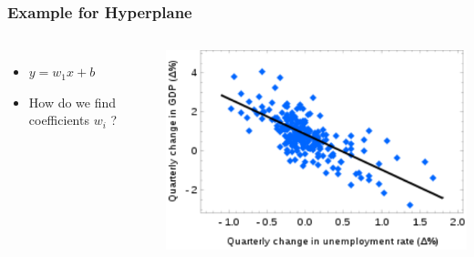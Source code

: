 \begin{frame}
    \frametitle{Example for Hyperplane}
    \begin{columns}
            \begin{itemize}
                \item $y =  w_1 x + b$
                \item How do we find coefficients $w_i$ ? 
            \end{itemize}
            \includegraphics[width=1\linewidth]{linreg-pics/lg}\\

    \end{columns}
\end{frame}





